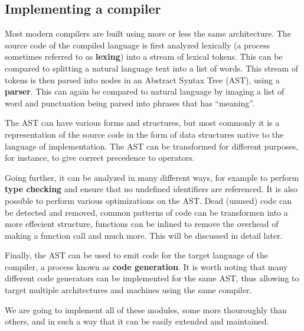 \subsection{Implementing a compiler}
Most modern compilers are built using more or less the same architecture. The source code of the compiled language is first analyzed lexically (a process sometimes referred to as \textbf{lexing}) into a stream of lexical tokens. This can be compared to splitting a natural language text into a list of words. This stream of tokens is then parsed into nodes in an Abstract Syntax Tree (AST), using a \textbf{parser}. This can again be compared to natural language by imaging a list of word and punctuation being parsed into phrases that has ``meaning''.

The AST can have various forms and structures, but most commonly it is a representation of the source code in the form of data structures native to the language of implementation. The AST can be transformed for different purposes, for instance, to give correct precedence to operators.

Going further, it can be analyzed in many different ways, for example to perform \textbf{type checking} and ensure that no undefined identifiers are referenced. It is also possible to perform various optimizations on the AST. Dead (unused) code can be detected and removed, common patterns of code can be transformen into a more effecient structure, functions can be inlined to remove the overhead of making a function call and much more. This will be discussed in detail later.

Finally, the AST can be used to emit code for the target language of the compiler, a process known as \textbf{code generation}. It is worth noting that many different code generators can be implemented for the same AST, thus allowing to target multiple architectures and machines using the same compiler.

We are going to implement all of these modules, some more thouroughly than others, and in such a way that it can be easily extended and maintained.